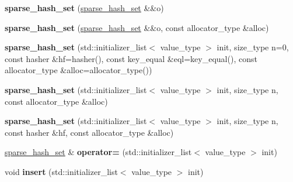 \begin{DoxyCompactItemize}
\item 
{\bfseries sparse\+\_\+hash\+\_\+set} (\hyperlink{classspp___1_1sparse__hash__set}{sparse\+\_\+hash\+\_\+set} \&\&o)\hypertarget{classspp___1_1sparse__hash__set_add9da1edd0289f1460bd2a869ce0b083}{}\label{classspp___1_1sparse__hash__set_add9da1edd0289f1460bd2a869ce0b083}

\item 
{\bfseries sparse\+\_\+hash\+\_\+set} (\hyperlink{classspp___1_1sparse__hash__set}{sparse\+\_\+hash\+\_\+set} \&\&o, const allocator\+\_\+type \&alloc)\hypertarget{classspp___1_1sparse__hash__set_a5fa0c5c142a1d2a859f45e0f82510863}{}\label{classspp___1_1sparse__hash__set_a5fa0c5c142a1d2a859f45e0f82510863}

\item 
{\bfseries sparse\+\_\+hash\+\_\+set} (std\+::initializer\+\_\+list$<$ value\+\_\+type $>$ init, size\+\_\+type n=0, const hasher \&hf=hasher(), const key\+\_\+equal \&eql=key\+\_\+equal(), const allocator\+\_\+type \&alloc=allocator\+\_\+type())\hypertarget{classspp___1_1sparse__hash__set_ac11172613cd9e2719f5cdac483f74261}{}\label{classspp___1_1sparse__hash__set_ac11172613cd9e2719f5cdac483f74261}

\item 
{\bfseries sparse\+\_\+hash\+\_\+set} (std\+::initializer\+\_\+list$<$ value\+\_\+type $>$ init, size\+\_\+type n, const allocator\+\_\+type \&alloc)\hypertarget{classspp___1_1sparse__hash__set_a4d62fa4494629e77596e217431c58f10}{}\label{classspp___1_1sparse__hash__set_a4d62fa4494629e77596e217431c58f10}

\item 
{\bfseries sparse\+\_\+hash\+\_\+set} (std\+::initializer\+\_\+list$<$ value\+\_\+type $>$ init, size\+\_\+type n, const hasher \&hf, const allocator\+\_\+type \&alloc)\hypertarget{classspp___1_1sparse__hash__set_a3a73cc64b5773eea24935ffcec136adc}{}\label{classspp___1_1sparse__hash__set_a3a73cc64b5773eea24935ffcec136adc}

\item 
\hyperlink{classspp___1_1sparse__hash__set}{sparse\+\_\+hash\+\_\+set} \& {\bfseries operator=} (std\+::initializer\+\_\+list$<$ value\+\_\+type $>$ init)\hypertarget{classspp___1_1sparse__hash__set_aeb627cec234b4426538024862fd4fba1}{}\label{classspp___1_1sparse__hash__set_aeb627cec234b4426538024862fd4fba1}

\item 
void {\bfseries insert} (std\+::initializer\+\_\+list$<$ value\+\_\+type $>$ init)\hypertarget{classspp___1_1sparse__hash__set_a652382c468aacf25cec7664a2fb53998}{}\label{classspp___1_1sparse__hash__set_a652382c468aacf25cec7664a2fb53998}


\end{DoxyCompactItemize}
